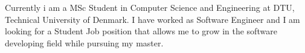 

\begin{cvparagraph}

Currently i am a MSc Student in Computer Science and Engineering at DTU, Technical University of Denmark. I have worked as Software Engineer and I am looking for a Student Job position that allows me to grow in the software developing field while pursuing my master.
\end{cvparagraph}
